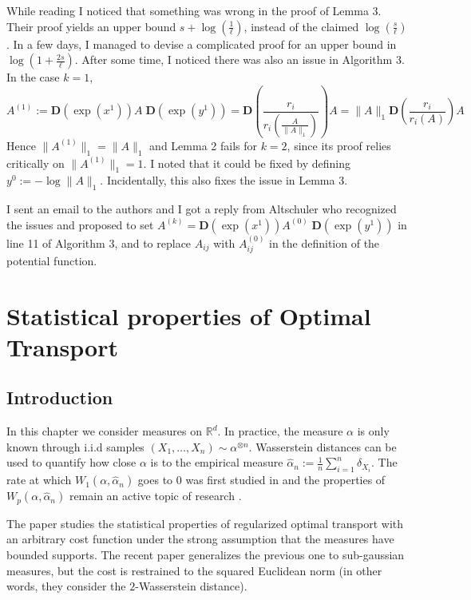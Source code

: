 \documentclass[12pt]{report}
\theoremstyle{definition}
\theoremstyle{remark}
\begin{document}
While reading \cite{altschuler2017near} I noticed that something was wrong in the proof of Lemma 3. Their proof yields an upper bound $s+\log\left(\frac 1\ell\right)$, instead of the claimed $\log\left(\frac s\ell\right)$. In a few days, I managed to devise a complicated proof for an upper bound in $\log\left(1+\frac {2s}{\ell}\right)$. After some time, I noticed there was also an issue in Algorithm 3.  In the case $k=1$, $$A^{(1)}:=\mathbf{D}\left(\exp \left(x^{1}\right)\right) A \; \mathbf{D}\left(\exp \left(y^{1}\right)\right) = \mathbf{D} \left(\frac{r_i}{r_i(\frac{A}{\|A\|_1})}\right)A = \|A\|_1 \mathbf{D} \left(\frac{r_i}{r_i(A)}\right)A$$ 
Hence $\|A^{(1)}\|_1 = \|A\|_1$ and Lemma 2 fails for $k=2$, since its proof relies critically on $\|A^{(1)}\|_1=1$. I noted that it could be fixed by defining $y^{0}:=-\log \|A\|_1$. Incidentally, this also fixes the issue in Lemma 3. 
\par I sent an email to the authors and I got a reply from Altschuler who recognized the issues and proposed to set $A^{(k)}=\mathbf{D}\left(\exp \left(x^{1}\right)\right) A^{(0)} \; \mathbf{D}\left(\exp \left(y^{1}\right)\right)$ in line 11 of Algorithm 3, and to replace $A_{ij}$ with $A_{ij}^{(0)}$ in the definition of the potential function.





\newpage
\chapter{Statistical properties of Optimal Transport}

\section{Introduction}
\hspace{\parindent} In this chapter we consider measures on $\mathbb R^d$. In practice, the measure $\alpha$ is only known through i.i.d samples $(X_1,\ldots,X_n)\sim \alpha^{\otimes n}$. Wasserstein distances can be used to quantify how close $\alpha$ is to the empirical measure $\hat \alpha_n:= \frac 1n \sum_{i=1}^n \delta_{X_i}$. The rate at which $W_1(\alpha, \hat \alpha_n)$ goes to $0$ was first studied in \cite{dudley1969speed} and the properties of $W_p(\alpha, \hat \alpha_n)$ remain an active topic of research \cite{weed2019sharp}.

\par The paper \cite{genevay2018sample} studies the statistical properties of regularized optimal transport with an arbitrary cost function under the strong assumption that the measures have bounded supports. The recent paper \cite{mena2019statistical} generalizes the previous one to sub-gaussian measures, but the cost is restrained to the squared Euclidean norm (in other words, they consider the $2$-Wasserstein distance).
\end{document}
